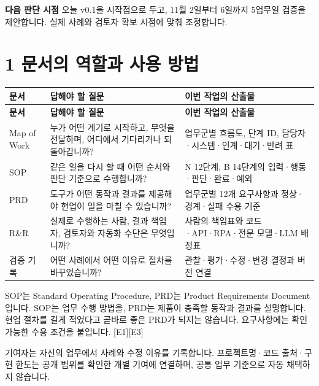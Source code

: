 \documentclass[a4paper,10pt]{article}
\newcommand{\Hline}{\noalign{\hrule height 1.5pt}}
\begin{document}
\noindent\textbf{다음 판단 시점} 오늘 v0.1을 시작점으로 두고, 11월 2일부터 6일까지 5업무일 검증을 제안합니다. 실제 사례와 검토자 확보 시점에 맞춰 조정합니다.


\clearpage
\section*{1 문서의 역할과 사용 방법}
{\fontsize{9.2}{13.616}\selectfont
\begin{longtable}{!{\vrule width 1.5pt}L{28.40mm}|L{64.70mm}|L{64.70mm}!{\vrule width 1.5pt}}
\Hline{} \textbf{문서} & \textbf{답해야 할 질문} & \textbf{이번 작업의 산출물}\\\hline\endfirsthead
\Hline{} \textbf{문서} & \textbf{답해야 할 질문} & \textbf{이번 작업의 산출물}\\\hline\endhead
\hline\endfoot\Hline\endlastfoot
Map of Work & 누가 어떤 계기로 시작하고, 무엇을 전달하며, 어디에서 기다리거나 되돌아갑니까? & 업무군별 흐름도, 단계 ID, 담당자·시스템·인계·대기·반려 표\\\hline
SOP & 같은 일을 다시 할 때 어떤 순서와 판단 기준으로 수행합니까? & N 12단계, B 14단계의 입력·행동·판단·완료·예외\\\hline
PRD & 도구가 어떤 동작과 결과를 제공해야 현업이 일을 마칠 수 있습니까? & 업무군별 12개 요구사항과 정상·경계·실패 수용 기준\\\hline
R\&R & 실제로 수행하는 사람, 결과 책임자, 검토자와 자동화 수단은 무엇입니까? & 사람의 책임표와 코드·API·RPA·전문 모델·LLM 배정표\\\hline
검증 기록 & 어떤 사례에서 어떤 이유로 절차를 바꾸었습니까? & 관찰·평가·수정·변경 결정과 버전 연결\\\hline
\end{longtable}}
SOP는 Standard Operating Procedure, PRD는 Product Requirements Document입니다. SOP는 업무 수행 방법을, PRD는 제품이 충족할 동작과 결과를 설명합니다. 현업 절차를 길게 적었다고 곧바로 좋은 PRD가 되지는 않습니다. 요구사항에는 확인 가능한 수용 조건을 붙입니다. [E1][E3]


기여자는 자신의 업무에서 사례와 수정 이유를 기록합니다. 프로젝트명·코드 출처·구현 한도는 공개 범위를 확인한 개별 기여에 연결하며, 공통 업무 기준으로 자동 채택하지 않습니다.
\end{document}
